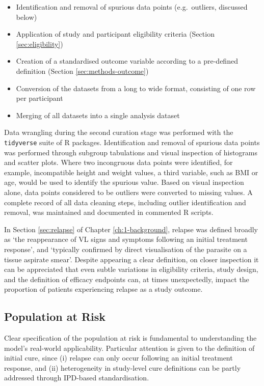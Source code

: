 \begin{itemize}[noitemsep]
  \item Identification and removal of spurious data points (e.g.\ outliers, discussed below)
  \item Application of study and participant eligibility criteria (Section \ref{sec:eligibility})
  \item Creation of a standardised outcome variable according to a pre-defined definition (Section \ref{sec:methods-outcome})
  \item Conversion of the datasets from a long to wide format, consisting of one row per participant
  \item Merging of all datasets into a single analysis dataset
\end{itemize}

Data wrangling during the second curation stage was performed with the \texttt{tidyverse} suite of R packages\cite{wickham2019}. Identification and removal of spurious data points was performed through subgroup tabulations and visual inspection of histograms and scatter plots. Where two incongruous data points were identified, for example, incompatible height and weight values, a third variable, such as BMI or age, would be used to identify the spurious value. Based on visual inspection alone, data points considered to be outliers were converted to missing values.  A complete record of all data cleaning steps, including outlier identification and removal, was maintained and documented in commented R scripts.

In Section \ref{sec:relapse} of Chapter \ref{ch:1-background}, relapse was defined broadly as `the reappearance of VL signs and symptoms following an initial treatment response', and `typically confirmed by direct visualisation of the parasite on a tissue aspirate smear'. Despite appearing a clear definition, on closer inspection it can be appreciated that even subtle variations in eligibility criteria, study design, and the definition of efficacy endpoints can, at times unexpectedly, impact the proportion of patients experiencing relapse as a study outcome.

\subsection*{\label{sec:eligibility}Population at Risk}

Clear specification of the population at risk is fundamental to understanding the model's real-world applicability\cite{riley2021_book_ch17, collins2024A}. Particular attention is given to the definition of initial cure, since (i) relapse can only occur following an initial treatment response, and (ii) heterogeneity in study-level cure definitions can be partly addressed through IPD-based standardisation.

